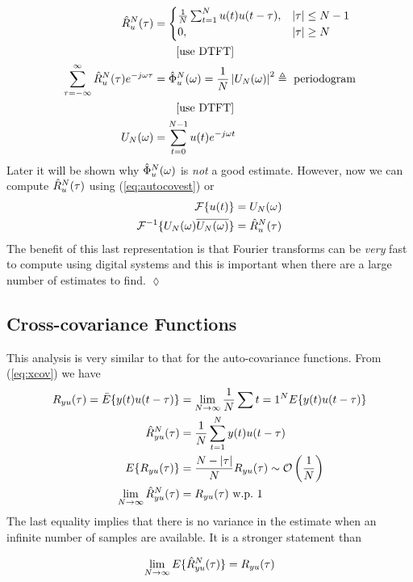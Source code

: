 \begin{example}
\begin{align*}
\hat{R}_u^N (\tau) &= \begin{cases} \frac{1}{N}\sum_{t=1}^N u(t)u(t-\tau), & |\tau|\leq N-1 \\ 0, & |\tau|\geq N \end{cases} \\
&\qquad[\text{use DTFT}] \\
\sum_{\tau=-\infty}^\infty\hat{R}_u^N (\tau) e^{-j\omega\tau} &= \hat{\Phi}_u^N (\omega) = \frac{1}{N}\left|U_N(\omega)\right|^2 \triangleq \text{~periodogram} \\
&\qquad[\text{use DTFT}] \\
U_N(\omega) &= \sum_{t=0}^{N-1}u(t)e^{-j\omega t}
\end{align*}
Later it will be shown why $\hat{\Phi}_u^N (\omega)$ is \textit{not} a good estimate.
However, now we can compute $\hat{R}_u^N (\tau)$ using (\ref{eq:autocovest}) or
\begin{align*}
\mathcal{F}\{u(t)\} &= U_N(\omega) \\
\mathcal{F}^{-1}\{U_N(\omega)\overline{U_N(\omega)}\} &= \hat{R}_u^N (\tau)
\end{align*}
The benefit of this last representation is that Fourier transforms can be \textit{very} fast to compute using digital systems and this is important when there are a large number of estimates to find.
$\lozenge$
\end{example}

\subsection{Cross-covariance Functions}
This analysis is very similar to that for the auto-covariance functions.
From (\ref{eq:xcov}) we have
\begin{align*}
R_{yu}(\tau) = \bar{E}\{y(t)u(t-\tau)\} &= \lim_{N\to\infty}\frac{1}{N}\sum{t=1}^N E\{y(t)u(t-\tau)\} \\
\hat{R}_{yu}^N (\tau) &= \frac{1}{N}\sum_{t=1}^N y(t)u(t-\tau) \\
E\{R_{yu}(\tau)\} &= \frac{N-|\tau|}{N}R_{yu}(\tau) \sim \mathcal{O}\left(\frac{1}{N}\right) \\
\lim_{N\to\infty}\hat{R}_{yu}^N (\tau) &= R_{yu}(\tau) \text{~w.p.~} 1
\end{align*}
The last equality implies that there is no variance in the estimate when an infinite number of samples are available.
It is a stronger statement than

\begin{equation*}
\lim_{N\to\infty}E\{\hat{R}_{yu}^N (\tau)\} = R_{yu}(\tau)
\end{equation*}

